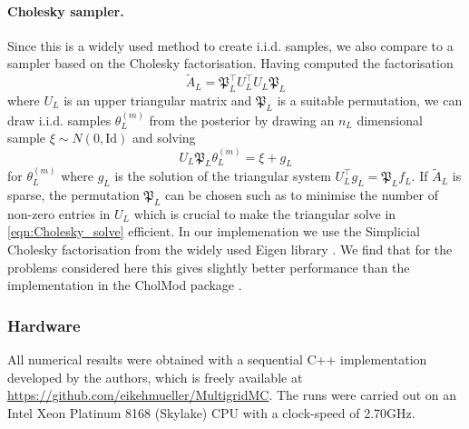 \documentclass[11pt,english]{article}
\theoremstyle{plain}
\theoremstyle{plain}
\theoremstyle{plain}
\theoremstyle{plain}
\numberwithin{equation}{section}
\begin{document}
\paragraph{Cholesky sampler.}
Since this is a widely used method to create i.i.d. samples, we also compare to a sampler based on the Cholesky factorisation. Having computed the factorisation
\begin{equation}
    \widetilde{A}_L = \mathfrak{P}_L^\top U^\top_L U_L \mathfrak{P}_L
\end{equation}
where $U_L$ is an upper triangular matrix and $\mathfrak{P}_L$ is a suitable permutation, we can draw i.i.d. samples $\theta_L^{(m)}$ from the posterior by drawing
an $n_L$ dimensional sample $\xi \sim N(0,\text{Id})$ and solving
\begin{equation}
    U_L \mathfrak{P}_L \theta_L^{(m)} = \xi + g_L\label{eqn:Cholesky_solve}
\end{equation}
for $\theta_L^{(m)}$ where $g_L$ is the solution of the triangular system $U_L^\top g_L = \mathfrak{P}_L f_L$. If $\widetilde{A}_L$ is sparse, the permutation $\mathfrak{P}_L$ can be chosen such as to minimise the number of non-zero entries in $U_L$ which is crucial to make the triangular solve in \eqref{eqn:Cholesky_solve} efficient. In our implemenation we use the Simplicial Cholesky factorisation from the widely used Eigen library \cite{eigenweb}. We find that for the problems considered here this gives slightly better performance than the implementation in the CholMod package \cite{chen2008algorithm}.
\subsubsection{Hardware}
All numerical results were obtained with a sequential C++ implementation developed by the authors, which is freely available at \url{https://github.com/eikehmueller/MultigridMC}. The runs were carried out on an Intel Xeon Platinum 8168 (Skylake) CPU with a clock-speed of 2.70GHz.
\end{document}
